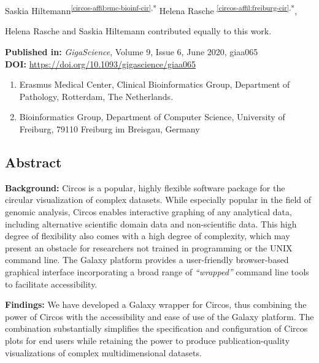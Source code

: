 \cleartorightpage
\setcounter{NAT@ctr}{-1}
\chapter*{}\label{chapter:circos}



Saskia Hiltemann\textsuperscript{\ref{circos-affil:emc-bioinf-cir},*}
Helena Rasche \textsuperscript{\ref{circos-affil:freiburg-cir},*},

{\color{chaptergrey}{*}} Helena Rasche and Saskia Hiltemann contributed equally to this work.

\textbf{Published in:} \emph{GigaScience}, Volume 9, Issue 6, June 2020, giaa065 \\
\textbf{DOI:} \url{https://doi.org/10.1093/gigascience/giaa065}

\small
\begin{enumerate}
 \itemsep-0.5em
 \item Erasmus Medical Center, Clinical Bioinformatics Group, Department of Pathology, Rotterdam, The Netherlands.\label{circos-affil:emc-bioinf-cir}
 \item Bioinformatics Group, Department of Computer Science, University of Freiburg, 79110 Freiburg im Breisgau, Germany\label{circos-affil:freiburg-cir}
\end{enumerate}
\normalsize


\section*{Abstract}

\textbf{Background:}
Circos is a popular, highly flexible software package for the circular visualization of complex datasets. While especially popular in the field of genomic analysis, Circos enables interactive graphing of any analytical data, including alternative scientific domain data and non-scientific data. This high degree of flexibility also comes with a high degree of complexity, which may present an obstacle for researchers not trained in programming or the UNIX command line. The Galaxy platform provides a user-friendly browser-based graphical interface incorporating a broad range of \emph{“wrapped”} command line tools to facilitate accessibility.


\textbf{Findings:}
We have developed a Galaxy wrapper for Circos, thus combining the power of Circos with the accessibility and ease of use of the Galaxy platform. The combination substantially simplifies the specification and configuration of Circos plots for end users while retaining the power to produce publication-quality visualizations of complex multidimensional datasets.

